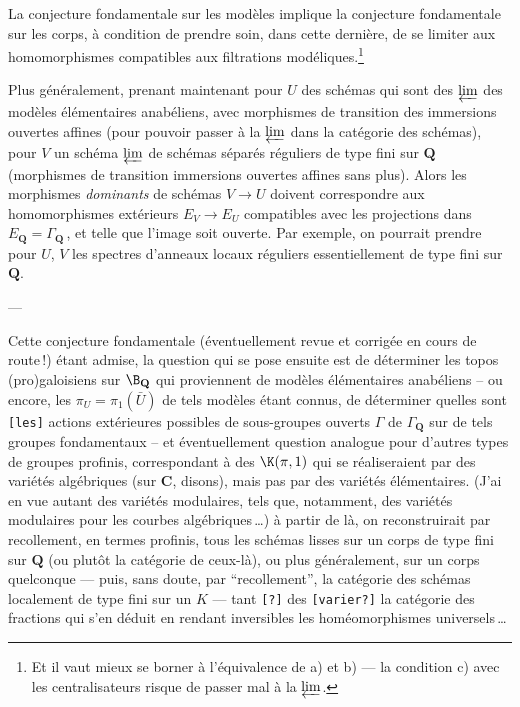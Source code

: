 \documentclass[12pt,twoside]{report}
\begin{document}
La conjecture fondamentale sur les modèles implique la conjecture
fondamentale sur les corps, à condition de prendre soin, dans cette
dernière, de se limiter aux homomorphismes compatibles aux
filtrations modéliques.\footnote{Et il vaut mieux se borner à
l'équivalence de a) et b) --- la condition c) avec les
centralisateurs risque de passer mal à la $\varprojlim$.}

Plus généralement, prenant maintenant pour $U$ des schémas qui sont
des $\varprojlim$ des modèles élémentaires anabéliens, avec
morphismes de transition des immersions ouvertes affines (pour
pouvoir passer à la $\varprojlim$ dans la catégorie des schémas),
pour $V$ un schéma $\varprojlim$ de schémas séparés réguliers de type
fini sur $\mathbf{Q}$ (morphismes de transition immersions ouvertes affines
sans plus). Alors les morphismes \emph{dominants} de schémas $V \to
U$ doivent correspondre aux homomorphismes extérieurs  $E_V \to E_U$
compatibles avec les projections dans $E_\mathbf{Q} = \Gamma_\mathbf{Q}\,$, et telle
que l'image soit ouverte. Par exemple, on pourrait prendre pour $U$,
$V$ les spectres d'anneaux locaux réguliers essentiellement%
de type fini sur $\mathbf{Q}$.

\begin{center}
---
\end{center}

Cette conjecture fondamentale (éventuellement revue et corrigée en
cours de route\,!) étant admise, la question qui se pose ensuite est
de déterminer les topos (pro)galoisiens sur $\B_{\mathbf{Q}}$ qui proviennent
de modèles élémentaires anabéliens -- ou encore, les $\pi_U =
\pi_1(\bar{U})$ de tels modèles étant connus, de déterminer quelles
sont
{\tt [les]} actions extérieures possibles de sous-groupes ouverts
$\Gamma$ de $\Gamma_{\mathbf{Q}}$ sur de tels groupes fondamentaux -- et
éventuellement question analogue pour d'autres types de groupes
profinis, correspondant à des $\K(\pi, 1)$ qui se réaliseraient par
des variétés algébriques (sur $\mathbf{C}$, disons), mais pas par des
variétés élémentaires. (J'ai en vue autant des variétés modulaires,
tels que, notamment, des variétés modulaires pour les courbes
algébriques\,\dots) à partir de là, on reconstruirait par
recollement, en termes profinis, tous les schémas lisses sur un corps
de type fini sur $\mathbf{Q}$ (ou plutôt la catégorie de ceux-là), ou plus
généralement, sur un corps quelconque --- puis, sans doute, par
``recollement'', la catégorie des schémas localement de type fini sur
un $K$ --- tant {\tt [?]} des {\tt [varier?]} la catégorie des
fractions qui s'en déduit en rendant inversibles les homéomorphismes
universels\,\dots
\end{document}
